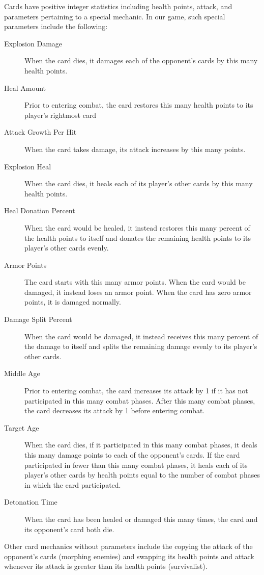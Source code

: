 \documentclass[letterpaper]{article} %
\begin{document}
Cards have positive integer statistics including health points, 
attack, and parameters pertaining to a special mechanic. In our game, such special parameters
include the following:

\begin{description}
	\item[Explosion Damage] When the card dies, it damages
	each of the opponent's cards by this many health points.
	\item[Heal Amount] Prior to entering combat, the card 
	restores this many health points to its player's rightmost
	card
	\item[Attack Growth Per Hit] When the card takes damage, its
	attack increases by this many points.
	\item[Explosion Heal] When the card dies, it heals
	each of its player's other cards by this many health points.
	\item[Heal Donation Percent] When the card would be healed,
	it instead restores this many percent of the health points
	to itself and donates the remaining health points to its
	player's other cards evenly.
	\item[Armor Points] The card starts with this many armor points.
	When the card would be damaged, it instead loses an armor point.
	When the card has zero armor points, it is damaged normally.
	\item[Damage Split Percent] When the card would be damaged,
	it instead receives this many percent of the damage to itself
	and splits the remaining damage evenly to its player's other cards.
	\item[Middle Age] Prior to entering combat, the card increases its
	attack by 1 if it has not participated in this many combat phases.
	After this many combat phases, the card decreases its attack by 1
	before entering combat.
	\item[Target Age] When the card dies, if it participated in this many
	combat phases, it deals this many damage points to each of the opponent's
	cards. If the card participated in fewer than this many combat phases, 
	it heals each of its player's other cards by health points equal to the
	number of combat phases in which the card participated.
	\item[Detonation Time] When the card has been healed or damaged this
	many times, the card and its opponent's card both die.
\end{description}

Other card mechanics without parameters include the copying the 
attack of the opponent's cards (morphing enemies) and swapping 
its health points and attack whenever its attack is greater than its health 
points (survivalist).
\end{document}
